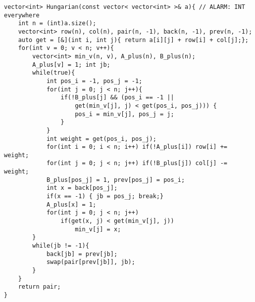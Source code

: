 \documentclass[12pt]{article}
\begin{document}
\begin{verbatim}
vector<int> Hungarian(const vector< vector<int> >& a){ // ALARM: INT everywhere
    int n = (int)a.size();
    vector<int> row(n), col(n), pair(n, -1), back(n, -1), prev(n, -1);
    auto get = [&](int i, int j){ return a[i][j] + row[i] + col[j];};
    for(int v = 0; v < n; v++){
        vector<int> min_v(n, v), A_plus(n), B_plus(n);
        A_plus[v] = 1; int jb;
        while(true){
            int pos_i = -1, pos_j = -1;
            for(int j = 0; j < n; j++){
                if(!B_plus[j] && (pos_i == -1 || 
                    get(min_v[j], j) < get(pos_i, pos_j))) {
                    pos_i = min_v[j], pos_j = j;
                }
            }
            int weight = get(pos_i, pos_j);
            for(int i = 0; i < n; i++) if(!A_plus[i]) row[i] += weight;
            for(int j = 0; j < n; j++) if(!B_plus[j]) col[j] -= weight;
            B_plus[pos_j] = 1, prev[pos_j] = pos_i;
            int x = back[pos_j];
            if(x == -1) { jb = pos_j; break;}
            A_plus[x] = 1;
            for(int j = 0; j < n; j++)
                if(get(x, j) < get(min_v[j], j))
                    min_v[j] = x;
        }
        while(jb != -1){
            back[jb] = prev[jb];
            swap(pair[prev[jb]], jb);
        }
    }
    return pair;
}
\end{verbatim}
\end{document}
